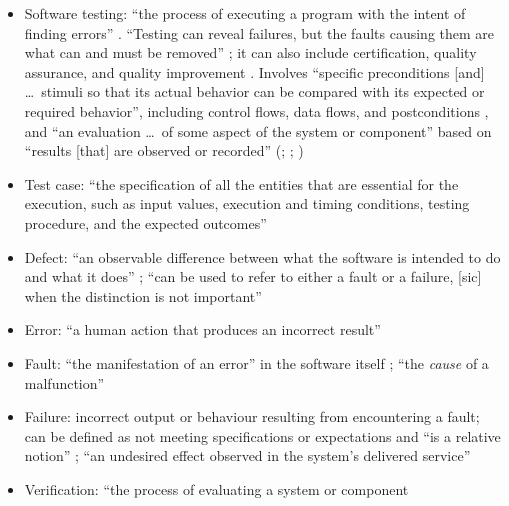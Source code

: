 \begin{itemize}
      \item Software testing: ``the process of executing a program with the
            intent of finding errors'' \citep[p.~438]{PetersAndPedrycz2000}
            . ``Testing can reveal
            failures, but the faults causing them are what can and must be
            removed'' \citep[p.~5-3]{SWEBOK2024}; it can also include
            certification, quality assurance, and quality improvement
            \citep[p.~5-4]{SWEBOK2024}. Involves ``specific preconditions
                  [and] \dots\ stimuli so that its actual behavior can be
            compared with its expected or required behavior'', including
            control flows, data flows, and postconditions
            \citep[p.~11]{Firesmith2015}, and ``an evaluation \dots\ of some
            aspect of the system or component'' based on ``results [that]
            are observed or recorded'' (\citealp[p.~10]{IEEE2022};
            \citeyear[p.~6]{IEEE2021}; \citeyear[p.~465]{IEEE2017}
            )
      \item Test case: ``the specification of all the entities
            that are essential for the execution, such as input values,
            execution and timing conditions, testing procedure, and the
            expected outcomes'' \citep[pp.~5-1 to 5-2]{SWEBOK2024}
      \item Defect: ``an observable difference between what the software is
            intended to do and what it does'' \citep[p.~1-1]{SWEBOK2024}; ``can
            be used to refer to either a fault or a failure, [sic] when the
            distinction is not important'' \citep[p.~4-3]{SWEBOK2014}
      \item Error: ``a human action that produces an incorrect result''
            \citep[p.~399]{vanVliet2000}
      \item Fault: ``the manifestation of an error'' in the software itself
            \citep[p.~400]{vanVliet2000}; ``the \emph{cause} of a malfunction''
            \citep[p.~5-3]{SWEBOK2024}
      \item Failure: incorrect output or behaviour resulting from encountering
            a fault; can be defined as not meeting specifications or
            expectations and ``is a relative notion''
            \citep[p.~400]{vanVliet2000}; ``an undesired effect observed in the
            system's delivered service'' \citep[p.~5-3]{SWEBOK2024}
      \item Verification: ``the process of evaluating a system or component

\end{itemize}
